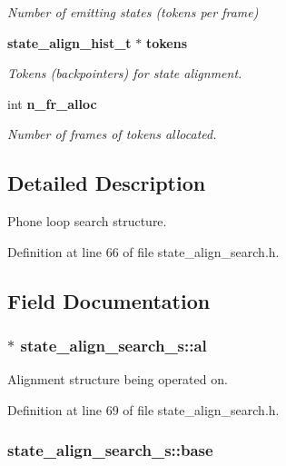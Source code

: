 \begin{DoxyCompactItemize}
\begin{DoxyCompactList}\small\item\em Number of emitting states (tokens per frame) \end{DoxyCompactList}\item 
{\bf state\-\_\-align\-\_\-hist\-\_\-t} $\ast$ {\bf tokens}
\begin{DoxyCompactList}\small\item\em Tokens (backpointers) for state alignment. \end{DoxyCompactList}\item 
int {\bf n\-\_\-fr\-\_\-alloc}
\begin{DoxyCompactList}\small\item\em Number of frames of tokens allocated. \end{DoxyCompactList}\end{DoxyCompactItemize}


\subsection{Detailed Description}
Phone loop search structure. 

Definition at line 66 of file state\-\_\-align\-\_\-search.\-h.



\subsection{Field Documentation}
\subsubsection[{al}]{$\ast$ state\-\_\-align\-\_\-search\-\_\-s\-::al}\label{structstate__align__search__s_a47b9b509c7416f8952ee452d8ce7dda6}


Alignment structure being operated on. 



Definition at line 69 of file state\-\_\-align\-\_\-search.\-h.

\subsubsection[{base}]{ state\-\_\-align\-\_\-search\-\_\-s\-::base}\label{structstate__align__search__s_ab2a596d687e113c88a271d1397b8d9c5}


